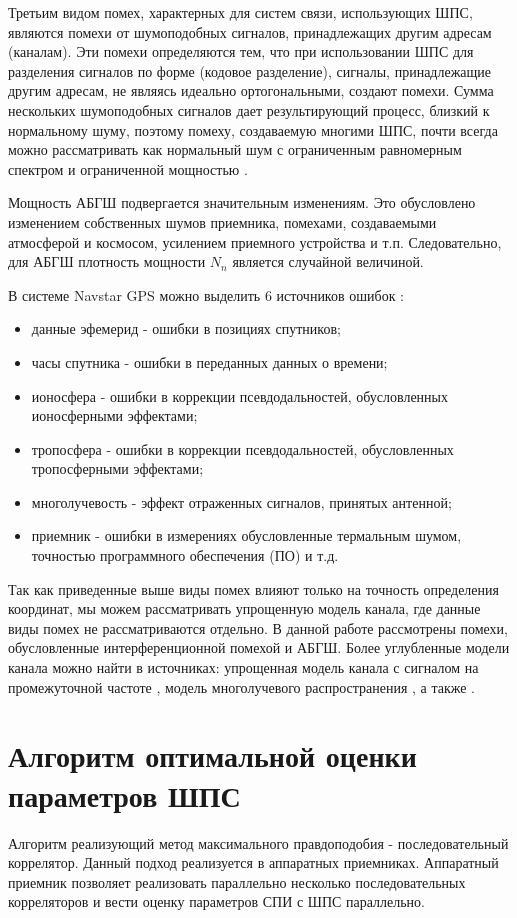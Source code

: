 Третьим видом помех, характерных для систем связи, использующих ШПС, являются помехи от шумоподобных сигналов,
принадлежащих другим адресам (каналам). Эти помехи определяются тем, что при использовании ШПС для разделения
сигналов по форме (кодовое разделение), сигналы, принадлежащие другим адресам, не являясь идеально ортогональными,
создают помехи. Сумма нескольких шумоподобных сигналов дает результирующий процесс, близкий к нормальному шуму,
поэтому помеху, создаваемую многими ШПС, почти всегда можно рассматривать как нормальный шум с ограниченным
равномерным спектром и ограниченной мощностью \cite{pestryakov-book}.

Мощность АБГШ подвергается значительным изменениям. Это обусловлено
изменением собственных шумов приемника, помехами, создаваемыми атмосферой и космосом, усилением приемного устройства
и т.п. Следовательно, для АБГШ плотность мощности ${N_n}$ является случайной величиной.

В системе Navstar GPS можно выделить 6 источников ошибок \cite{parkinson_1996}:
\begin{itemize}
	\item {данные эфемерид - ошибки в позициях спутников;}
	\item {часы спутника - ошибки в переданных данных о времени;}
	\item {ионосфера - ошибки в коррекции псевдодальностей, обусловленных ионосферными эффектами;}
	\item {тропосфера - ошибки в коррекции псевдодальностей, обусловленных тропосферными эффектами;}
	\item {многолучевость - эффект отраженных сигналов, принятых антенной;}
	\item {приемник - ошибки в измерениях обусловленные термальным шумом, точностью программного обеспечения (ПО) и т.д.}
\end{itemize}

Так как приведенные выше виды помех влияют только на точность определения координат, мы можем рассматривать упрощенную модель
канала, где данные виды помех не рассматриваются отдельно. В данной работе рассмотрены помехи, обусловленные интерференционной помехой и АБГШ. 
Более углубленные модели канала можно найти в
источниках: упрощенная модель канала с сигналом на промежуточной частоте \cite{lei_dong_phd}, модель многолучевого
распространения \cite{hannah_phd}, а также \cite{burns_model, corbell_model, brown_model}.

\section{Алгоритм оптимальной оценки параметров ШПС}
Алгоритм реализующий метод максимального правдоподобия - последовательный коррелятор. Данный подход реализуется в аппаратных приемниках.
Аппаратный приемник позволяет реализовать параллельно несколько последовательных корреляторов и вести оценку параметров
СПИ с ШПС параллельно.

